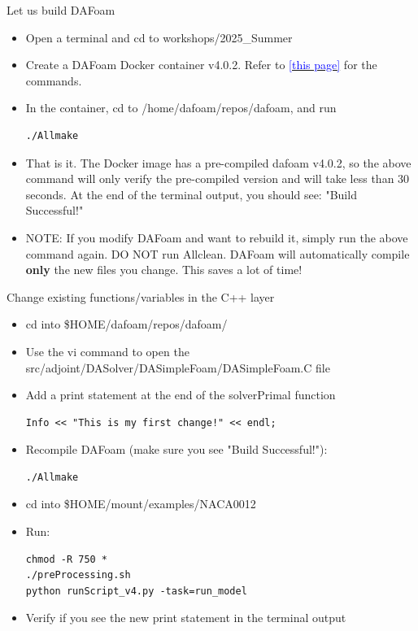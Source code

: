 \documentclass{bredelebeamer}
\begin{document}
\begin{frame}[fragile]{Let us build DAFoam}


\begin{itemize}
  \setlength\itemsep{0.5em}
  \item Open a terminal and cd to workshops/2025\_Summer
 \item Create a DAFoam Docker container v4.0.2. Refer to \href{https://dafoam.github.io/mydoc_get_started_run.html}{\textcolor{blue}{[this page]}} for the commands.
 \item In the container, cd to /home/dafoam/repos/dafoam, and run
 \begin{lstlisting}
./Allmake
 \end{lstlisting}
 \item That is it. The Docker image has a pre-compiled dafoam v4.0.2, so the above command will only verify the pre-compiled version and will take less than 30 seconds. At the end of the terminal output, you should see: "Build Successful!"
 \item NOTE: If you modify DAFoam and want to rebuild it, simply run the above command again. DO NOT run Allclean. DAFoam will automatically compile \textbf{only} the new files you change. This saves a lot of time!
\end{itemize}
  
\end{frame}

\begin{frame}[fragile]{Change existing functions/variables in the C++ layer}

\begin{itemize}
  \item cd into \$HOME/dafoam/repos/dafoam/
  \item Use the vi command to open the src/adjoint/DASolver/DASimpleFoam/DASimpleFoam.C file
  \item Add a print statement at the end of the solverPrimal function
 \begin{lstlisting}
Info << "This is my first change!" << endl;
 \end{lstlisting}
  \item Recompile DAFoam (make sure you see "Build Successful!"):
 \begin{lstlisting}
./Allmake
 \end{lstlisting}
  \item cd into \$HOME/mount/examples/NACA0012
  \item Run:
\begin{lstlisting}
chmod -R 750 *
./preProcessing.sh
python runScript_v4.py -task=run_model
\end{lstlisting}
 \item Verify if you see the new print statement in the terminal output
    
\end{itemize}

\end{frame}
\end{document}
